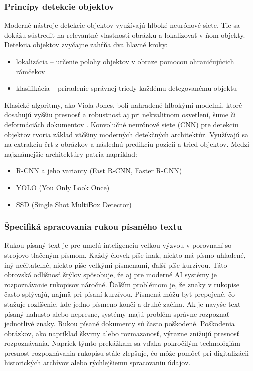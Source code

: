         \subsubsection{Princípy detekcie objektov}
        Moderné nástroje detekcie objektov využívajú hlboké neurónové siete. Tie sa dokážu
        sústrediť na relevantné vlastnosti obrázku a lokalizovať v ňom objekty. Detekcia objektov
        zvyčajne zahŕňa dva hlavné kroky: 
        \begin{itemize}
            \item lokalizácia – určenie polohy objektov v obraze pomocou ohraničujúcich rámčekov 
            \item klasifikácia – priradenie správnej triedy každému detegovanému objektu 
        \end{itemize}
        Klasické algoritmy, ako Viola-Jones, boli nahradené hlbokými modelmi, ktoré
        dosahujú vyššiu presnosť a robustnosť aj pri nekvalitnom osvetlení, šume či deformáciách
        dokumentov \cite{redmon2016yolo, ren2015faster}. 
        Konvolučné neurónové siete (CNN) pre detekciu objektov tvoria základ väčšiny moderných detekčných architektúr. Využívajú sa na extrakciu črt z obrázkov a následnú predikciu pozícií a tried objektov. Medzi najznámejšie architektúry patria napríklad:
            \begin{itemize}
                \item R-CNN a jeho varianty (Fast R-CNN, Faster R-CNN) \cite{girshick2014rcnn}
                \item YOLO (You Only Look Once) \cite{redmon2016yolo}
                \item SSD (Single Shot MultiBox Detector) \cite{liu2016ssd}
            \end{itemize}
        \subsubsection{Špecifiká spracovania rukou písaného textu}
        Rukou písaný text je pre umelú inteligenciu veľkou výzvou v porovnaní so strojovo tlačeným písmom. Každý človek píše inak, niekto má písmo uhladené, iný nečitateľné, niekto píše veľkými písmenami, ďalší píše kurzívou. Táto obrovská odlišnosť štýlov spôsobuje, že aj pre moderné AI systémy je rozpoznávanie rukopisov náročné.
        Ďalším problémom je, že znaky v rukopise často splývajú, najmä pri písaní kurzívou. Písmená môžu byť prepojené, čo sťažuje rozlíšenie, kde jedno písmeno končí a druhé začína. Ak je navyše text písaný nahusto alebo nepresne, systémy majú problém správne rozpoznať jednotlivé znaky.
        Rukou písané dokumenty sú často poškodené. Poškodenia obrázkov, ako napríklad škvrny alebo rozmazanosť, výrazne znižujú presnosť rozpoznávania.
        Napriek týmto prekážkam sa vďaka pokročilým technológiám presnosť rozpoznávania rukopisu stále zlepšuje, čo môže pomôcť pri digitalizácii historických archívov alebo rýchlejšiemu spracovaniu údajov.

